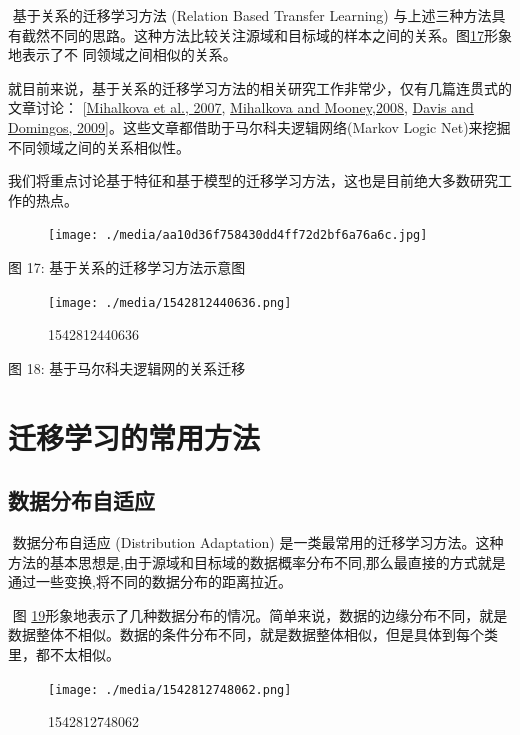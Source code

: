 ​ 基于关系的迁移学习方法 (Relation Based Transfer Learning)
与上述三种方法具有截然不同的思路。这种方法比较关注源域和目标域的样本之间的关系。图\protect\hyperlink{bookmark82}{17}形象地表示了不
同领域之间相似的关系。

​
就目前来说，基于关系的迁移学习方法的相关研究工作非常少，仅有几篇连贯式的文章讨论：
{[}\protect\hyperlink{bookmark283}{Mihalkova et al., 2007},
\protect\hyperlink{bookmark284}{Mihalkova and Mooney,2008},
\protect\hyperlink{bookmark244}{Davis and Domingos,
2009}{]}。这些文章都借助于马尔科夫逻辑网络(Markov Logic
Net)来挖掘不同领域之间的关系相似性。

​
我们将重点讨论基于特征和基于模型的迁移学习方法，这也是目前绝大多数研究工作的热点。

\begin{figure}
\centering
\texttt{[image: ./media/aa10d36f758430dd4ff72d2bf6a76a6c.jpg]}
\caption{}
\end{figure}

图 17: 基于关系的迁移学习方法示意图

\begin{figure}
\centering
\texttt{[image: ./media/1542812440636.png]}
\caption{1542812440636}
\end{figure}

图 18: 基于马尔科夫逻辑网的关系迁移

\section{迁移学习的常用方法}\label{ux8fc1ux79fbux5b66ux4e60ux7684ux5e38ux7528ux65b9ux6cd5}

\subsection{数据分布自适应}\label{ux6570ux636eux5206ux5e03ux81eaux9002ux5e94}

​ 数据分布自适应 (Distribution Adaptation)
是一类最常用的迁移学习方法。这种方法的基本思想是,由于源域和目标域的数据概率分布不同,那么最直接的方式就是通过一些变换,将不同的数据分布的距离拉近。

​ 图
\protect\hyperlink{bookmark84}{19}形象地表示了几种数据分布的情况。简单来说，数据的边缘分布不同，就是数据整体不相似。数据的条件分布不同，就是数据整体相似，但是具体到每个类里，都不太相似。

\begin{figure}
\centering
\texttt{[image: ./media/1542812748062.png]}
\caption{1542812748062}
\end{figure}


